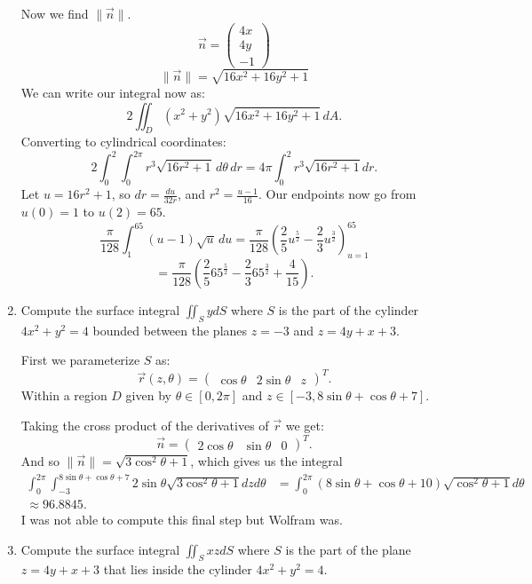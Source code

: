 \documentclass{article}
\begin{document}
\begin{enumerate}
    Now we find $\|\vec{n}\|$.
    \[
        \vec{n}=\begin{pmatrix} 4x \\ 4y \\ -1 \end{pmatrix} 
    \] 
    \[
        \|\vec{n}\|=\sqrt{16x^2+16y^2+1} 
    \] 
    We can write our integral now as:
    \[
    2\iint_D (x^2+y^2)\sqrt{16x^2+16y^2+1} \, dA
    .\] 
    Converting to cylindrical coordinates:
    \[
    2\int_0^2\int_0^{2\pi} r^3\sqrt{16r^2+1}  \, d\theta\,dr=4\pi \int_{0}^{2} r^3\sqrt{16r^2+1} dr 
    .\] 
    Let $u=16r^2+1$, so $dr=\frac{du}{32r}$, and $r^2=\frac{u-1}{16}$.
    Our endpoints now go from $u(0)=1$ to $u(2)=65$.
    \[
    \frac{\pi}{128}\int_{1}^{65}  (u-1)\sqrt{u} \,du=\frac{\pi}{128}\left( \frac{2}{5}u^{\frac{5}{2}}
    -\frac{2}{3}u^{\frac{3}{2}}\right) _{u=1}^{65}
    \] 
    \[
    =\frac{\pi}{128}\left(\frac{2}{5}65^\frac{5}{2}-\frac{2}{3}65^{\frac{3}{2}}+\frac{4}{15}\right)
    .\] 
    
\item Compute the surface integral $\iint_S y dS$ where $S$ is the part of the cylinder
$4x^2 + y^2 = 4$ bounded between the planes $z = -3$ and $z = 4y + x + 3$.

First we parameterize $S$ as:
\[
    \vec{r}(z,\theta)=\begin{pmatrix} \cos\theta&2\sin\theta&z \end{pmatrix} ^{T}
.\] 
Within a region $D$ given by $\theta\in [0,2\pi]$ and $z\in [-3,8\sin\theta+\cos\theta+7].$

Taking the cross product of the derivatives of $\vec{r}$ we get:
\[
    \vec{n}=\begin{pmatrix} 2\cos\theta & \sin\theta & 0 \end{pmatrix} ^{T}
.\] 
And so $\|\vec n\|=\sqrt{3\cos^2\theta+1} $, which gives us the integral
\begin{align*}
    \int_{0}^{2\pi}\int_{-3}^{8\sin\theta+\cos\theta+7}2\sin\theta\sqrt{3\cos^2\theta+1} dzd\theta&= 
    \int_{0}^{2\pi} (8\sin\theta+\cos\theta+10)\sqrt{\cos^2\theta+1} d\theta \\
    \approx 96.8845
.\end{align*}
I was not able to compute this final step but Wolfram was.

\item Compute the surface integral $\iint_S xz dS$ where $S$ is the part of the plane
$z = 4y + x + 3$ that lies inside the cylinder $4x^2 + y^2 = 4$.


\end{enumerate}
\end{document}
